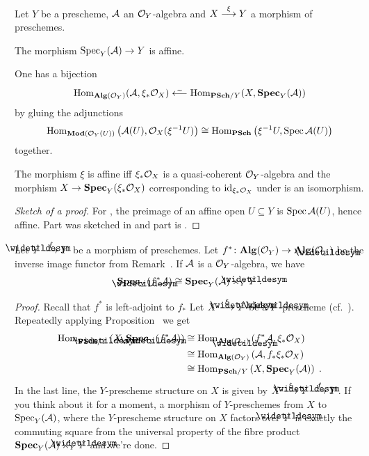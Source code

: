 \documentclass[a4paper,parskip=half,numbers=enddot, DIV=12]{scrreprt}
\begin{document}
\begin{prop}
	Let $Y$ be a prescheme, $\mathcal{A}$ an $\mathcal{O}_Y$-algebra and $X\morphism[\xi]Y$ a morphism of preschemes.
	\begin{alphanumerate}
		\item The morphism $\Spec_Y(\Aa)\morphism Y$ is affine.
		\item One has a bijection
		\begin{align}\lbl{eq:SPECAdjunction}
			\Hom_{\cat{Alg}(\Oo_Y)}(\Aa,\xi_*\Oo_X)\lisomorphism\Hom_{\cat{PSch}/Y}(X,\SPEC_Y(\Aa))
		\end{align}
		by gluing the adjunctions 
		\begin{align*}
			\Hom_{\cat{Mod}(\Oo_Y(U))}\left(\Aa(U),\Oo_X(\xi^{-1}U)\right)\cong \Hom_{\cat{PSch}}\left(\xi^{-1}U,\Spec \Aa(U)\right)
		\end{align*}
		together.
		\item The morphism $\xi$ is affine iff $\xi_*\mathcal{O}_X$ is a quasi-coherent $\mathcal{O}_Y$-algebra and the morphism $X\morphism\SPEC_Y(\xi_*\Oo_X)$ corresponding to $\operatorname{id}_{\xi_*\mathcal{O}_X}$ under  is an isomorphism.
	\end{alphanumerate}
\end{prop}
\begin{proof}[Sketch of a proof]
	For , the preimage of an affine open $U\subseteq Y$ is $\operatorname{Spec} \mathcal{A}(U)$, hence affine. Part  was sketched in \cite[Proposition~2.5.1]{alggeo1} and part  is \cite[Lemma~2.5.1]{alggeo1}.
\end{proof}
\begin{cor}
	Let $\snake{Y}\morphism[f] Y$ be a morphism of preschemes. Let $f^*\colon \cat{Alg}(\Oo_Y)\morphism\cat{Alg}(\Oo_{\snake{Y}})$ be the inverse image functor from Remark~. If $\mathcal{A}$ is a $\mathcal{O}_Y$-algebra, we have 
	\begin{align*}
		\SPEC_{\snake{Y}}(f^*\Aa)\cong \SPEC_Y(\Aa)\times_Y\snake{Y}\;.
	\end{align*}
\end{cor}
\begin{proof}
	Recall that $f^*$ is left-adjoint to $f_*$ Let $X\morphism[\xi]\snake{Y}$ be a $\snake{Y}$-prescheme (cf.\ \cite[Definition~1.5.7]{alggeo1}). Repeatedly applying Proposition~ we get
	\begin{align*}
		\Hom_{\cat{PSch}/\snake{Y}}\left(X,\SPEC_{\snake{Y}}(f^*\Aa)\right)&\cong \Hom_{\cat{Alg}(\Oo_{\snake{Y}})}\left(f^*\Aa,\xi_*\Oo_X\right)\\
		&\cong\Hom_{\cat{Alg}(\Oo_Y)}\left(\Aa,f_*\xi_*\Oo_X\right)\\
		&\cong \Hom_{\cat{PSch}/Y}\left(X,\SPEC_Y(\Aa)\right)\;.
	\end{align*}
	In the last line, the $Y$-prescheme structure on $X$ is given by $X\morphism[\xi]\snake{Y}\morphism[f]Y$. If you think about it for a moment, a morphism of $Y$-preschemes from $X$ to $\operatorname{Spec}_Y(\mathcal{A})$, where the $Y$-prescheme structure on $X$ factors over $\snake{Y}$ is exactly the commuting square from the universal property of the fibre product $\SPEC_Y(\Aa)\times_Y\snake{Y}$ and we're done.
\end{proof}
\end{document}
